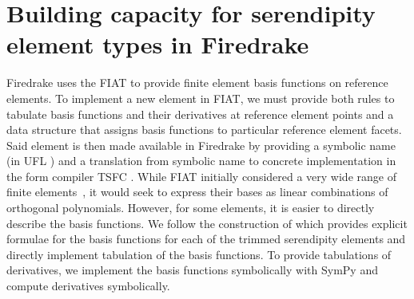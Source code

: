 \documentclass[format=acmsmall,screen,timestamp=false,a4paper]{acmart}
\DeclareMathOperator{\Div}{div}
\DeclareMathOperator{\curl}{curl}
\newcommand\akg[1]{\textbf{\textcolor[rgb]{.5,0,1}{[Andrew: #1]}}}
\newcommand\lm[1]{\textbf{\textcolor[rgb]{1,0,0.5}{[Lawrence: #1]}}}
\newcommand\rck[1]{\textbf{\textcolor[rgb]{1,0.5,0.5}{[Rob: #1]}}}
\newcommand{\hcurl}{\ensuremath{{H}(\curl ) } }
\newcommand{\hdiv}{\ensuremath{{H}(\Div ) } }
\begin{document}
  
  
  \section{Building capacity for serendipity element types in Firedrake}
  \label{sec:buildcap}

  Firedrake uses the FIAT \cite{kirby2004algorithm,kirby2012fiat} to provide finite element basis functions on reference elements.  
  To implement a new element in FIAT, we must provide both rules to tabulate basis functions and their derivatives at reference element points and a data structure that assigns basis functions to particular reference element facets.
  Said element is then made available in Firedrake by providing a symbolic name (in UFL \cite{alnaes2014unified}) and a translation from symbolic name to concrete implementation in the form compiler TSFC \cite{homolya2018tsfc}.  While FIAT initially considered a very wide range of finite elements~\cite{kirby2012common}, it would seek to express their bases as linear combinations of orthogonal polynomials.  However, for some elements, it is easier to directly describe the basis functions.
  We follow the construction of \cite{gillette2019computational} which provides explicit formulae for the basis functions for each of the trimmed serendipity elements and directly implement tabulation of the basis functions. To provide tabulations of derivatives, we implement the basis functions symbolically with SymPy \cite{sympy2017} and compute derivatives symbolically.  %
  
  
  
\end{document}
